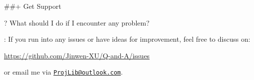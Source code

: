 \documentclass[%
  use style = classical,
  scroll,
]{Q-and-A}
\begin{document}
##+ {Get Support}

?
  What should I do if I encounter any problem?

:
  If you run into any issues or have ideas for improvement, feel free to discuss on:
  \begin{center}
      \url{https://github.com/Jinwen-XU/Q-and-A/issues}
  \end{center}
  or email me via \href{mailto:ProjLib@outlook.com}{\texttt{ProjLib@outlook.com}}.


\vspace{3\baselineskip}



\end{document}
